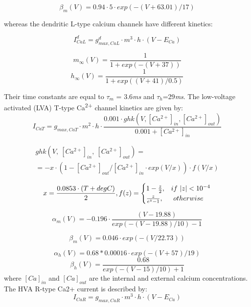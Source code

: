 \documentclass[12pt]{article}
\begin{document}
\begin{equation}
 \beta_m(V)=0.94 \cdot 5 \cdot exp(-(V+63.01)/17)
\end{equation}


whereas the dendritic L-type calcium channels have different kinetics: 


\begin{equation}
I_{CaL}^d= g_{max, CaL}^d \cdot m^3 \cdot h \cdot
(V-E_{Ca})
\end{equation}

\begin{equation}
m_{\infty}(V)=\frac {1}{1+exp(-(V+37))}
\end{equation}
\begin{equation}
h_{\infty}(V)=\frac {1}{1+exp( (V+41)/0.5)}
\end{equation}

Their time constants are equal to $\tau_m$ = 3.6\textit{ms} and $\tau_h$=29\textit{ms}. The low-voltage activated (LVA) T-type Ca\textsuperscript{2+} channel kinetics are given by:
\begin{equation}
I_{CaT} = g_{max, CaT}\cdot m^2\cdot h \cdot \frac{0.001 \cdot ghk(V,[Ca^{2+}]_{in},[Ca^{2+}]_{out})}{0.001+[Ca^{2+}]_{in} }
\end{equation}

\begin{eqnarray}
ghk(V,\ [Ca^{2+}]_{in},\ [Ca^{2+}]_{out}) = \nonumber \\
= -x\cdot (1 - [Ca^{2+}]_{out}/[Ca^{2+}]_{in} \cdot exp(V/x)) \cdot f(V/x)
\end{eqnarray}

\begin{equation}
x=\frac{0.0853\cdot (T+degC)}{2}, \\
f(z) = \begin{cases} 1-\frac {z}{2}, & if \ |z|<10^{-4} \\ \frac z{e^z-1}, & \  otherwise \ \end{cases}
\end{equation}

\begin{equation}
\alpha_m(V)=-0.196\cdot \frac{(V-19.88)}{exp(-(V-19.88)/10)-1} 
\end{equation}

\begin{equation}
\beta_m(V) = 0.046\cdot exp(-(V/22.73))
\end{equation}

\begin{equation}
\alpha_h(V)=0.68 * 0.00016\cdot exp(-(V+57)/19)
\end{equation}
\begin{equation}
\beta_h(V)=\frac {0.68}{exp(-(V-15)/10)+1}
\end{equation}
where $[Ca]_{in}$ and $[Ca]_{out}$ are the internal and external calcium concentrations. The HVA R-type Ca2+ current is described by:
\begin{equation}
I_{CaR} = g_{max, CaR}\cdot m^3\cdot h\cdot (V-E_{Ca})
\end{equation}
\end{document}
